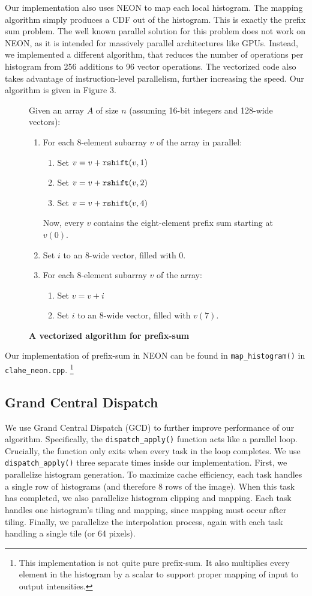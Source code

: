 \documentclass[10pt,twocolumn,letterpaper]{article}
\begin{document}
Our implementation also uses NEON to map each local histogram. The mapping algorithm simply produces a CDF out of the histogram. This is exactly the prefix sum problem. The well known parallel solution for this problem does not work on NEON, as it is intended for massively parallel architectures like GPUs. Instead, we implemented a different algorithm, that reduces the number of operations per histogram from 256 additions to 96 vector operations. The vectorized code also takes advantage of instruction-level parallelism, further increasing the speed. Our algorithm is given in Figure 3.
\begin{figure}[h]
\caption{\textbf{A vectorized algorithm for prefix-sum}}
Given an array $A$ of size $n$ (assuming 16-bit integers and 128-wide vectors):
\begin{enumerate}
\itemsep0em
\item For each 8-element subarray $v$ of the array in parallel:
	\begin{enumerate}
	\itemsep0em
	\item Set $v = v + \verb"rshift"(v, 1)$
	\item Set $v = v + \verb"rshift"(v, 2)$
	\item Set $v = v + \verb"rshift"(v, 4)$
	\end{enumerate}
Now, every $v$ contains the eight-element prefix sum starting at $v(0)$. 
\item Set $i$ to an 8-wide vector, filled with $0$.
\item For each 8-element subarray $v$ of the array:
	\begin{enumerate}
	\itemsep0em
	\item Set $v = v + i$
	\item Set $i$ to an 8-wide vector, filled with $v(7)$.
	\end{enumerate}
\end{enumerate}
\end{figure}

Our implementation of prefix-sum in NEON can be found in \verb"map_histogram()" in \verb"clahe_neon.cpp". \footnote{This implementation is not quite pure prefix-sum. It also multiplies every element in the histogram by a scalar to support proper mapping of input to output intensities.}

\subsection{Grand Central Dispatch}
We use Grand Central Dispatch (GCD) to further improve performance of our algorithm. Specifically, the \verb"dispatch_apply()" function acts like a parallel loop. Crucially, the function only exits when every task in the loop completes. We use \verb"dispatch_apply()" three separate times inside our implementation. First, we parallelize histogram generation. To maximize cache efficiency, each task handles a single row of histograms (and therefore 8 rows of the image). When this task has completed, we also parallelize histogram clipping and mapping. Each task handles one histogram's tiling and mapping, since mapping must occur after tiling. Finally, we parallelize the interpolation process, again with each task handling a single tile (or 64 pixels).
\end{document}
